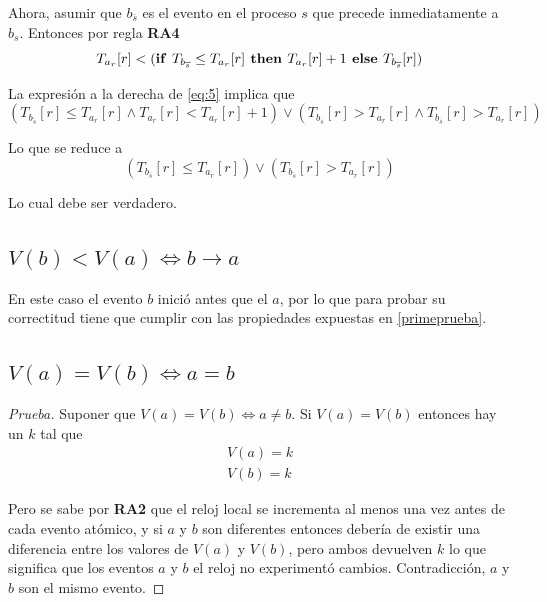 \documentclass[12pt, times]{simauth}
\begin{document}
Ahora, asumir que $b_{\overline{s}}$ es el evento en el proceso $s$ que precede inmediatamente a $b_s$. Entonces por regla \textbf{RA4}
\begin{equation}\label{eq:5}
T_{a_r}[r] < (\textnormal{\textbf{if }} T_{b_{\overline{s}}} \leq T_{a_r}[r] \textnormal{\textbf{ then }} T_{a_r}[r] + 1 \textnormal{\textbf{ else }} T_{b_{\overline{s}}}[r])
\end{equation}

La expresión a la derecha de \ref{eq:5} implica que
\begin{equation}
(T_{b_{\overline{s}}}[r] \leq T_{a_r}[r] \land T_{a_r}[r] < T_{a_r}[r] + 1) \lor (T_{b_{\overline{s}}}[r] > T_{a_r}[r] \land T_{b_{\overline{s}}}[r] > T_{a_r}[r])
\end{equation}

Lo que se reduce a
\begin{equation}
(T_{b_{\overline{s}}}[r] \leq T_{a_r}[r]) \lor (T_{b_{\overline{s}}}[r] > T_{a_r}[r])
\end{equation}

Lo cual debe ser verdadero.

\subsection{$V(b) < V(a) \Longleftrightarrow b \to a$}
En este caso el evento $b$ inició antes que el $a$, por lo que para probar su correctitud tiene que cumplir con las propiedades expuestas en \ref{primeprueba}. 

\subsection{$V(a) = V(b) \Longleftrightarrow a = b$}
\begin{proof}[Prueba]
Suponer que $V(a) = V(b) \Longleftrightarrow a \ne b$. Si $V(a) = V(b)$ entonces hay un $k$ tal que
\begin{align*}
V(a) = k\\
V(b) = k 
\end{align*}

Pero se sabe por \textbf{RA2} que el reloj local se incrementa al menos una vez antes de cada evento atómico, y si $a$ y $b$ son diferentes entonces debería de existir una diferencia entre los valores de $V(a)$ y $V(b)$, pero ambos devuelven $k$ lo que significa que los eventos $a$ y $b$  el reloj no experimentó cambios. Contradicción, $a$ y $b$ son el mismo evento.
\end{proof}
\end{document}
